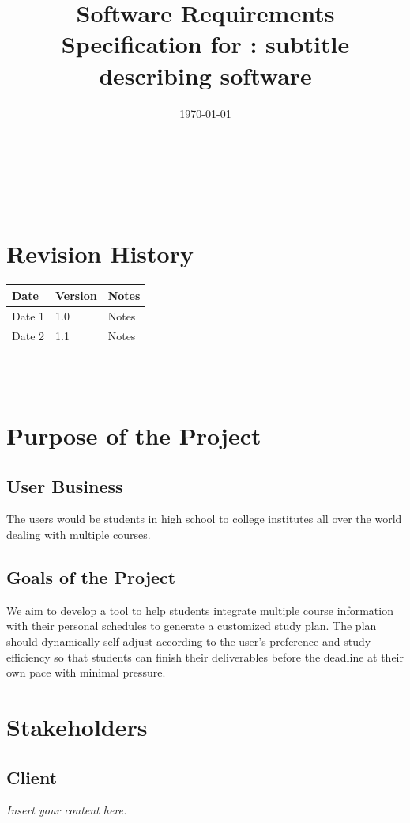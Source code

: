 \documentclass[12pt]{article}
\newcommand{\lips}{\textit{Insert your content here.}}
\begin{document}
\title{Software Requirements Specification for \progname: subtitle describing software} 
\author{\authname}
\date{\today}
	
\maketitle
~\newpage


\tableofcontents

~\newpage

\section*{Revision History}

\begin{tabularx}{\textwidth}{p{3cm}p{2cm}X}
\toprule {\textbf{Date}} & {\textbf{Version}} & {\textbf{Notes}}\\
\midrule
Date 1 & 1.0 & Notes\\
Date 2 & 1.1 & Notes\\
\bottomrule
\end{tabularx}

~\\

~\newpage
\section{Purpose of the Project}
\subsection{User Business}
The users would be students in high school to college institutes all over the world dealing with multiple courses.

\subsection{Goals of the Project}
We aim to develop a tool to help students integrate multiple course information with their personal schedules to generate a customized study plan. The plan should dynamically self-adjust according to the user's preference and study efficiency so that students can finish their deliverables before the deadline at their own pace with minimal pressure.
\section{Stakeholders}
\subsection{Client}
\lips
\end{document}
